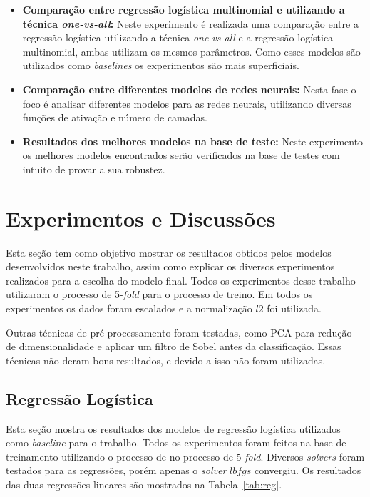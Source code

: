 \documentclass[conference]{IEEEtran}
\begin{document}
\begin{itemize}
	\item \textbf{Comparação entre regressão logística multinomial e utilizando a técnica \emph{one-vs-all}:} Neste experimento é realizada uma comparação entre a regressão logística utilizando a técnica \emph{one-vs-all} e a regressão logística multinomial, ambas utilizam os mesmos parâmetros. Como esses modelos são utilizados como \emph{baselines} os experimentos são mais superficiais.
	
	\item \textbf{Comparação entre diferentes modelos de redes neurais:} Nesta fase o foco é analisar diferentes modelos para as redes neurais, utilizando diversas funções de ativação e número de camadas.  
	
	\item \textbf{Resultados dos melhores modelos na base de teste:} Neste experimento os melhores modelos encontrados serão verificados na base de testes com intuito de provar a sua robustez.
\end{itemize}


\section{Experimentos e Discussões}

Esta seção tem como objetivo mostrar os resultados obtidos pelos modelos desenvolvidos neste trabalho, assim como explicar os diversos experimentos realizados para a escolha do modelo final. Todos os experimentos desse trabalho utilizaram o processo de 5-\emph{fold} para o processo de treino. Em todos os experimentos os dados foram escalados e a normalização $l2$ foi utilizada. 

Outras técnicas de pré-processamento foram testadas, como PCA para redução de dimensionalidade e aplicar um filtro de Sobel antes da classificação. Essas técnicas não deram bons resultados, e devido a isso não foram utilizadas.

\subsection{Regressão Logística}

Esta seção mostra os resultados dos modelos de regressão logística utilizados como \emph{baseline} para o trabalho. Todos os experimentos foram feitos na base de treinamento utilizando o processo de  no processo de 5-\emph{fold}. Diversos \emph{solvers} foram testados para as regressões, porém apenas o \emph{solver} $lbfgs$ convergiu. Os resultados das duas regressões lineares são mostrados na Tabela~\ref{tab:reg}.
\end{document}
